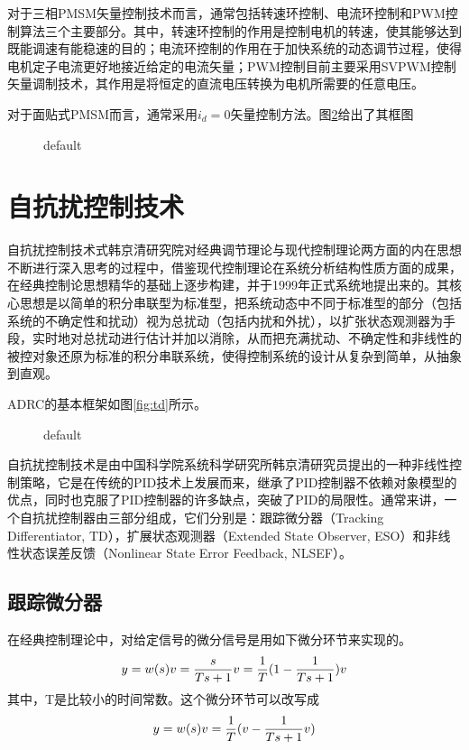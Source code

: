 对于三相PMSM矢量控制技术而言，通常包括转速环控制、电流环控制和PWM控制算法三个主要部分。其中，转速环控制的作用是控制电机的转速，使其能够达到既能调速有能稳速的目的；电流环控制的作用在于加快系统的动态调节过程，使得电机定子电流更好地接近给定的电流矢量；PWM控制目前主要采用SVPWM控制矢量调制技术，其作用是将恒定的直流电压转换为电机所需要的任意电压。

对于面贴式PMSM而言，通常采用$i_d=0$矢量控制方法。图\ref{fig:vc}给出了其框图
\begin{figure}[htbp]
\begin{center}

\caption{default}
\label{fig:vc}
\end{center}
\end{figure}


\section{自抗扰控制技术}
自抗扰控制技术式韩京清研究院对经典调节理论与现代控制理论两方面的内在思想不断进行深入思考的过程中，借鉴现代控制理论在系统分析结构性质方面的成果，在经典控制论思想精华的基础上逐步构建，并于1999年正式系统地提出来的。其核心思想是以简单的积分串联型为标准型，把系统动态中不同于标准型的部分（包括系统的不确定性和扰动）视为总扰动（包括内扰和外扰），以扩张状态观测器为手段，实时地对总扰动进行估计并加以消除，从而把充满扰动、不确定性和非线性的被控对象还原为标准的积分串联系统，使得控制系统的设计从复杂到简单，从抽象到直观。

ADRC的基本框架如图\ref{fig:td}所示。
\begin{figure}[htbp]
\begin{center}
\caption{default}
\label{fig:vc}
\end{center}
\end{figure}




自抗扰控制技术是由中国科学院系统科学研究所韩京清研究员提出的一种非线性控制策略，它是在传统的PID技术上发展而来，继承了PID控制器不依赖对象模型的优点，同时也克服了PID控制器的许多缺点，突破了PID的局限性。通常来讲，一个自抗扰控制器由三部分组成，它们分别是：跟踪微分器（Tracking Differentiator, TD），扩展状态观测器（Extended State Observer, ESO）和非线性状态误差反馈（Nonlinear State Error Feedback, NLSEF）。
\subsection{跟踪微分器}
在经典控制理论中，对给定信号的微分信号是用如下微分环节来实现的。
\begin{equation}
\centering
\label{equ:1}
y = w(s)v = \frac{s}{{Ts + 1}}v = \frac{1}{T}(1 - \frac{1}{{Ts + 1}})v
\end{equation}
其中，T是比较小的时间常数。这个微分环节可以改写成
\begin{equation}
\centering
\label{equ:2}
y = w(s)v = \frac{1}{T}(v - \frac{1}{{Ts + 1}}v)
\end{equation}

